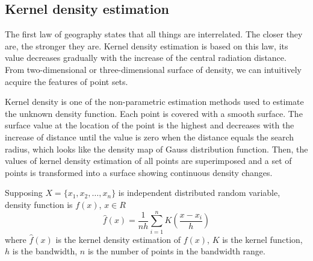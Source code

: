\documentclass[11pt]{report}
\begin{document}
	
	\subsection{Kernel density estimation}
	The first law of geography states that all things are interrelated. The closer they are, the stronger they are. Kernel density estimation is based on this law, its value decreases gradually with the increase of the central radiation distance. From two-dimensional or three-dimensional surface of density, we can intuitively acquire the features of point sets. 
	
	\noindent \cite{reportkernel} \cite{doi:10.1080/02331880500439782}Kernel density is one of the non-parametric estimation methods used to estimate the unknown density function. Each point is covered with a smooth surface. The surface value at the location of the point is the highest and decreases with the increase of distance until the value is zero when the distance equals the search radius, which looks like the density map of Gauss distribution function. Then, the values of kernel density estimation of all points are superimposed and a set of points is transformed into a surface showing continuous density changes. 
	
	\noindent Supposing $X=\{x_1,x_2,\dots,x_n\}$ is independent distributed random variable, density function is $f(x)$, $x\in R$
	\begin{equation}
	\hat{f}(x) = \frac{1}{nh} \sum_{i=1}^{n}K\left(\frac{x-x_i}{h}\right)
	\end{equation}
	where $\hat{f}(x)$ is the kernel density estimation of $f(x)$,  $K$ is the kernel function, $h$ is the bandwidth, $n$ is the number of points in the bandwidth range. \\
	
\end{document}
